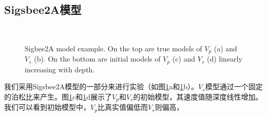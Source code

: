 \subsection{Sigsbee2A模型}
\begin{figure}
   \centering
   \\
   \caption{Sigbee2A model example. On the top are true models of 
   $V_p$ (a) and $V_s$ (b). On the bottom are initial models of $V_p$ (c) and $V_s$
   (d) linearly increasing with depth. }
   \label{fig:TrueAndInitial}
\end{figure}
我们采用Sigsbee2A模型的一部分来进行实验（如图\ref{fig:TrueAndInitial}a和\ref{fig:TrueAndInitial}b）。$V_s$模型通过一个固定的泊松比来产生。图\ref{fig:TrueAndInitial}c和\ref{fig:TrueAndInitial}d展示了$V_p$和$V_s$的初始模型，其速度值随深度线性增加。我们可以看到初始模型中，$V_p$比真实值偏低而$V_s$则偏高，
